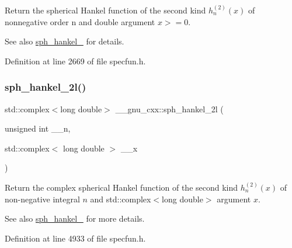 Return the spherical Hankel function of the second kind $ h^{(2)}_n(x)$ of nonnegative order n and { double} argument $ x >= 0 $.

\begin{DoxySeeAlso}{See also}
\hyperlink{group__gnu__math__spec__func_ga1ca08866a25e3637b04c57ff5a0c36a5}{sph\+\_\+hankel\+\_} for details. 
\end{DoxySeeAlso}


Definition at line 2669 of file specfun.\+h.

\mbox{\label{group__gnu__math__spec__func_ga3d9d9aaceba455a5ddc79d178ee1cb6d}} 
\subsubsection{\texorpdfstring{sph\+\_\+hankel\+\_\+2l()}{sph\_hankel\_2l()}\hspace{0.1cm}{\footnotesize\ttfamily [2/2]}}
{\footnotesize\ttfamily std\+::complex$<$long double$>$ \+\_\+\+\_\+gnu\+\_\+cxx\+::sph\+\_\+hankel\+\_\+2l (\begin{DoxyParamCaption}\item[{unsigned int}]{\+\_\+\+\_\+n,  }\item[{std\+::complex$<$ long double $>$}]{\+\_\+\+\_\+x }\end{DoxyParamCaption})\hspace{0.3cm}{\ttfamily [inline]}}

Return the complex spherical Hankel function of the second kind $ h^{(2)}_n(x) $ of non-\/negative integral $ n $ and {\ttfamily std\+::complex$<$long double$>$} argument $ x $.

\begin{DoxySeeAlso}{See also}
\hyperlink{group__gnu__math__spec__func_ga1ca08866a25e3637b04c57ff5a0c36a5}{sph\+\_\+hankel\+\_} for more details. 
\end{DoxySeeAlso}


Definition at line 4933 of file specfun.\+h.

\mbox{\label{group__gnu__math__spec__func_gacbff28988d5d36f0c3b3fe03d4f57896}} 
